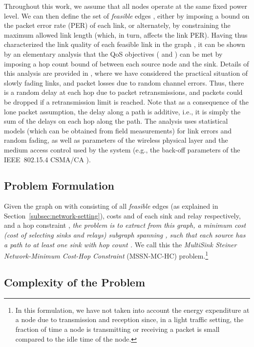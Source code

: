 \documentclass[conference]{IEEEtran}
\begin{document}
Throughout this work, we assume that all nodes operate at the same fixed power level. We can then define the set of \emph{feasible} edges , either by imposing a bound on the packet error rate (PER) of each link, or alternately, by constraining the maximum allowed link length (which, in turn, affects the link PER). Having thus characterized the link quality of each feasible link in the graph , it can be shown by an elementary analysis that the QoS objectives ( and ) can be met by imposing a hop count bound of  between each source node and the sink.  Details of this analysis are provided in \cite{fullpaper}, where we have considered the practical situation of slowly fading links, and packet losses due to random channel errors. Thus, there is a random delay at each hop due to packet retransmissions, and packets could be dropped if a retransmission limit is reached. Note that as a consequence of the lone packet assumption, the delay along a path is additive, i.e., it is simply the sum of the delays on each hop along the path. The analysis uses statistical models (which can be obtained from field measurements) for link errors and random fading, as well as parameters of the wireless physical layer and the medium access control used by the system (e.g., the back-off parameters of the IEEE~802.15.4 CSMA/CA \cite{IEEE}). 

\subsection{Problem Formulation}
\label{subsec:formulation}

Given the graph  on  with  consisting of all \emph{feasible} edges (as explained in Section~\ref{subsec:network-setting}), costs  and  of each sink and relay respectively, and a hop constraint , \emph{the problem is to extract from this graph, a minimum cost (cost of selecting sinks and relays) subgraph spanning , such that each source has a path to at least one sink with hop count .} We call this the \emph{MultiSink Steiner Network-Minimum Cost-Hop Constraint} (MSSN-MC-HC) problem.\footnote{In this formulation, we have not taken into account the energy expenditure at a node due to transmission and reception since, in a light traffic setting, the fraction of time a node is transmitting or receiving a packet is small compared to the idle time of the node.}


\subsection{Complexity of the Problem}
\end{document}
